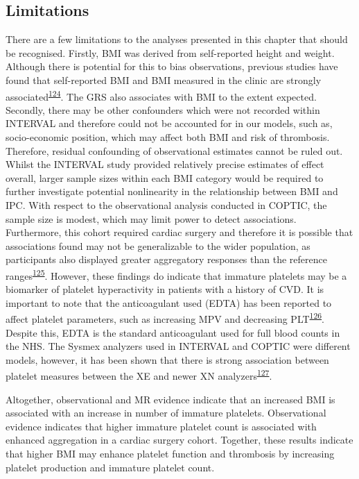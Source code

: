 \documentclass[11pt,twoside]{bristolthesis}
\begin{document}
\hypertarget{INTERVAL-limitations}{%
\subsection{Limitations}\label{INTERVAL-limitations}}

There are a few limitations to the analyses presented in this chapter that should be recognised. Firstly, BMI was derived from self-reported height and weight. Although there is potential for this to bias observations, previous studies have found that self-reported BMI and BMI measured in the clinic are strongly associated\textsuperscript{\protect\hyperlink{ref-Nikolaou2017}{124}}. The GRS also associates with BMI to the extent expected. Secondly, there may be other confounders which were not recorded within INTERVAL and therefore could not be accounted for in our models, such as, socio-economic position, which may affect both BMI and risk of thrombosis. Therefore, residual confounding of observational estimates cannot be ruled out. Whilst the INTERVAL study provided relatively precise estimates of effect overall, larger sample sizes within each BMI category would be required to further investigate potential nonlinearity in the relationship between BMI and IPC. With respect to the observational analysis conducted in COPTIC, the sample size is modest, which may limit power to detect associations. Furthermore, this cohort required cardiac surgery and therefore it is possible that associations found may not be generalizable to the wider population, as participants also displayed greater aggregatory responses than the reference ranges\textsuperscript{\protect\hyperlink{ref-Marcucci2015}{125}}. However, these findings do indicate that immature platelets may be a biomarker of platelet hyperactivity in patients with a history of CVD. It is important to note that the anticoagulant used (EDTA) has been reported to affect platelet parameters, such as increasing MPV and decreasing PLT\textsuperscript{\protect\hyperlink{ref-Mannuuxdf2020}{126}}. Despite this, EDTA is the standard anticoagulant used for full blood counts in the NHS. The Sysmex analyzers used in INTERVAL and COPTIC were different models, however, it has been shown that there is strong association between platelet measures between the XE and newer XN analyzers\textsuperscript{\protect\hyperlink{ref-Briggs2012}{127}}.

Altogether, observational and MR evidence indicate that an increased BMI is associated with an increase in number of immature platelets. Observational evidence indicates that higher immature platelet count is associated with enhanced aggregation in a cardiac surgery cohort. Together, these results indicate that higher BMI may enhance platelet function and thrombosis by increasing platelet production and immature platelet count.
\end{document}
